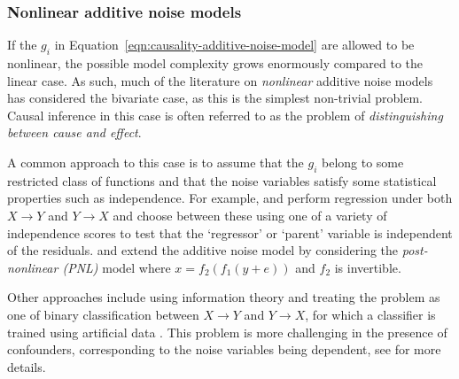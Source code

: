 \subsubsection{Nonlinear additive noise models}

If the $g_i$ in Equation~\ref{eqn:causality-additive-noise-model} are allowed to be nonlinear, the possible model complexity grows enormously compared to the linear case. 
As such, much of the literature on \emph{nonlinear} additive noise models has considered the bivariate case, as this is the simplest non-trivial problem. 
Causal inference in this case is often referred to as the problem of \emph{distinguishing between cause and effect}. 

A common approach to this case is to assume that the $g_i$ belong to some restricted class of functions and that the noise variables satisfy some statistical properties such as independence.
For example, \cite{hoyer2009nonlinear, peters2010identifying, mooij2010distinguishing} and \cite{peters2014causal} perform regression under both $X \longrightarrow Y$ and $Y \longrightarrow X$ and choose between these using one of a variety of independence scores to test that the `regressor' or `parent' variable is independent of the residuals. 
\cite{zhang2008distinguishing} and \cite{zhang2009identifiability} extend the additive noise model by considering the \emph{post-nonlinear (PNL)} model where $x = f_2(f_1(y+e))$ and $f_2$ is invertible. 

Other approaches include using information theory \citep{janzing2012information, janzing2010causal, janzing2009telling} and treating the problem as one of binary classification between $X \longrightarrow Y$ and $Y \longrightarrow X$, for which a classifier is trained using artificial data \citep{lopez2015towards}.
This problem is more challenging in the presence of confounders, corresponding to the noise variables being dependent, see \cite{hoyer2008estimation, janzing2009identifying} for more details.  



